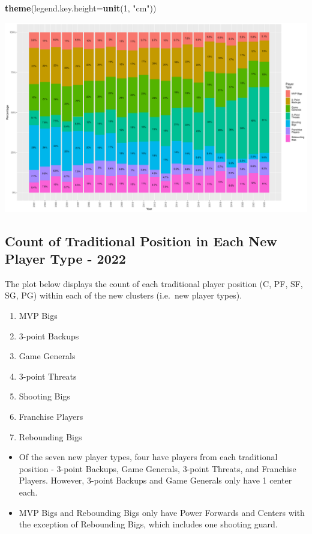 \documentclass[
]{article}
\newenvironment{Shaded}{\begin{snugshade}}{\end{snugshade}}
\newcommand{\AttributeTok}[1]{\textcolor[rgb]{0.13,0.29,0.53}{#1}}
\newcommand{\DecValTok}[1]{\textcolor[rgb]{0.00,0.00,0.81}{#1}}
\newcommand{\FunctionTok}[1]{\textcolor[rgb]{0.13,0.29,0.53}{\textbf{#1}}}
\newcommand{\NormalTok}[1]{#1}
\newcommand{\StringTok}[1]{\textcolor[rgb]{0.31,0.60,0.02}{#1}}
\providecommand{\tightlist}{%
  \setlength{\itemsep}{0pt}\setlength{\parskip}{0pt}}
\begin{document}
\begin{Shaded}
\begin{Highlighting}[]
  \FunctionTok{theme}\NormalTok{(}\AttributeTok{legend.key.height=}\FunctionTok{unit}\NormalTok{(}\DecValTok{1}\NormalTok{, }\StringTok{"cm"}\NormalTok{))}
\end{Highlighting}
\end{Shaded}

\includegraphics{Reclassifying-NBA-Player-Postions-Pt.-3---Clustering-Analysis-Results_files/figure-latex/unnamed-chunk-10-1.pdf}

\hypertarget{count-of-traditional-position-in-each-new-player-type---2022}{%
\subsection{Count of Traditional Position in Each New Player Type -
2022}\label{count-of-traditional-position-in-each-new-player-type---2022}}

The plot below displays the count of each traditional player position
(C, PF, SF, SG, PG) within each of the new clusters (i.e.~new player
types).

\begin{enumerate}
\def\labelenumi{\arabic{enumi}.}
\tightlist
\item
  MVP Bigs
\item
  3-point Backups
\item
  Game Generals
\item
  3-point Threats
\item
  Shooting Bigs
\item
  Franchise Players
\item
  Rebounding Bigs
\end{enumerate}

\begin{itemize}
\tightlist
\item
  Of the seven new player types, four have players from each traditional
  position - 3-point Backups, Game Generals, 3-point Threats, and
  Franchise Players. However, 3-point Backups and Game Generals only
  have 1 center each.
\item
  MVP Bigs and Rebounding Bigs only have Power Forwards and Centers with
  the exception of Rebounding Bigs, which includes one shooting guard.
\end{itemize}
\end{document}
